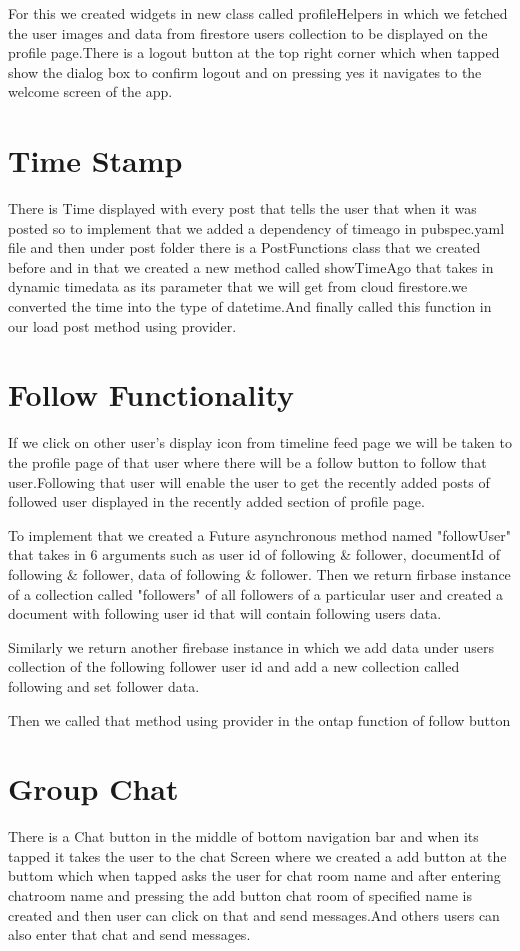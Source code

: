 For this we created widgets in new class called profileHelpers in which we fetched the user images and data from firestore users collection to be displayed on the profile page.There is a logout button at the top right corner which when tapped show the dialog box to confirm logout and on pressing yes it navigates to the welcome screen of the app.

\section{Time Stamp}
There is Time displayed with every post that tells the user that when it was posted so to implement that we added a dependency of timeago in pubspec.yaml file and then under post folder there is a PostFunctions class that we created before and in that we created a new method called showTimeAgo that takes in dynamic timedata as its parameter that we will get from cloud firestore.we converted the time into the type of datetime.And finally called this function in our load post method using provider.

\section{Follow Functionality}
If we click on other user's display icon from timeline feed page we will be taken to the profile page of that user where there will be a follow button to follow that user.Following that user will enable the user to get the recently added posts of followed user displayed in the recently added section of profile page.

To implement that we created a Future asynchronous method named "followUser" that takes in 6 arguments such as user id of following \& follower, documentId of following \& follower, data of following \& follower. Then we return firbase instance of a collection called "followers" of all followers of a particular user and created a document  with following user id that will contain following users data.

Similarly we return another firebase instance in which we add data under users collection of the following follower user id and add a new collection called following and set follower data. 

Then we called that method using provider in the ontap function of follow button
\section{Group Chat}
There is a Chat button in the middle of bottom navigation bar and when its tapped it takes the user to the chat Screen where we created a add button at the buttom which when tapped asks the user for chat room name and after entering chatroom name and pressing the add button chat room of specified name is created and then user can click on that and send messages.And others users can also enter that chat and send messages.

